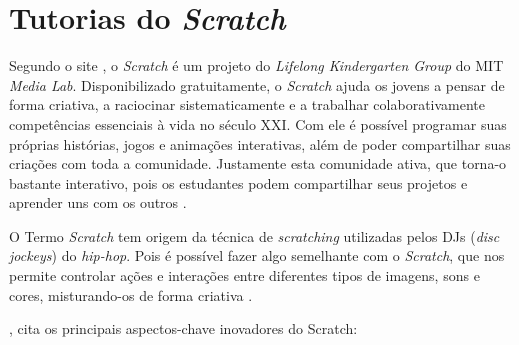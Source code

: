 \documentclass[12pt,fleqn]{book} %
\begin{document}



\chapter{Tutorias do \textit{Scratch}}

Segundo o site \cite{on:scratch2018}, o \textit{Scratch} é um projeto do \textit{Lifelong Kindergarten Group} do MIT \textit{Media Lab}. Disponibilizado gratuitamente, o \textit{Scratch} ajuda os jovens a pensar de forma criativa, a raciocinar sistematicamente e a trabalhar colaborativamente competências essenciais à vida no século XXI. Com ele é possível programar suas próprias histórias, jogos e animações interativas, além de poder compartilhar suas criações com toda a comunidade. Justamente esta comunidade ativa, que torna-o bastante interativo, pois os estudantes podem compartilhar seus projetos e aprender uns com os outros .

O Termo \textit{Scratch} tem origem da técnica de \textit{scratching} utilizadas pelos DJs (\textit{disc jockeys}) do \textit{hip-hop}. Pois é possível fazer algo semelhante com o \textit{Scratch}, que nos permite controlar ações e interações entre diferentes tipos de imagens, sons e cores, misturando-os de forma criativa \cite{marques2009recuperar}.

, cita os principais aspectos-chave inovadores do Scratch:
\end{document}
